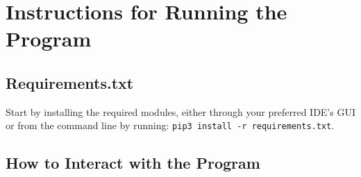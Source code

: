 \documentclass[fontsize=11pt]{article}
\begin{document}
\section{Instructions for Running the Program}

\subsection{Requirements.txt}

Start by installing the required modules, either through your preferred IDE's GUI or from the command line by running: \texttt{pip3 install -r requirements.txt}.

\subsection{How to Interact with the Program}
\end{document}
